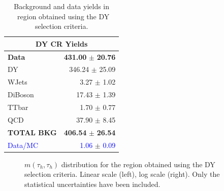 \begin{table}[ht]  
\begin{center}
\begin{tabular}{ | l | r |} \hline \hline 
 \multicolumn{2}{|c|}{DY CR Yields} \\ \hline \hline 
 \textbf{Data}         & \textbf{431.00}  $\pm$  \textbf{ 20.76} \\ \hline 
 DY         & 346.24   $\pm$   25.09 \\ \hline 
 WJets      & 3.27   $\pm$   1.02 \\ \hline 
 DiBoson    & 17.43   $\pm$   1.39 \\ \hline 
 TTbar      & 1.70   $\pm$   0.77 \\ \hline 
 QCD        & 37.90   $\pm$   8.45 \\ \hline 
 \textbf{TOTAL BKG} & \textbf{ 406.54}   $\pm$  \textbf{ 26.54} \\ \hline 
 \textcolor{blue}{Data/MC}         & \textcolor{blue}{1.06}  $\pm$  \textcolor{blue}{ 0.09} \\ \hline 
 \end{tabular}  
\end{center}
  \caption{Background and data yields in \Ztotauh~region obtained using the DY selection criteria.}
\label{tab:DYCRYields}
\end{table}

\begin{figure}[H]
\begin{center}
\captionsetup[subfloat]{farskip=0pt,captionskip=0.0cm,labelformat=empty}
\end{center}
\caption{$m(\tau_{h},\tau_{h})$ distribution for the region obtained using the 
DY selection criteria. Linear scale (left), log scale (right). Only the statistical uncertainties have been included.}
\label{fig:DYCR}
\end{figure}


